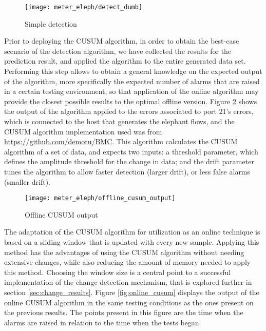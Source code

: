 \begin{figure}[H]
    \centering
    \texttt{[image: meter\_eleph/detect\_dumb]}
    \caption {Simple detection}
    \label{fig:detect_dumb}
\end{figure} 

\par Prior to deploying the CUSUM algorithm, in order to obtain the best-case scenario of the detection algorithm, we have collected the results for the prediction
result, and applied the algorithm to the entire generated data set. Performing this step allows to obtain a general knowledge on the expected output of the algorithm,
more specifically the expected number of alarms that are raised in a certain testing environment, so that application of the online algorithm may provide the
closest possible results to the optimal offline version. Figure  \ref{fig:offline_cusum} shows the output of the algorithm applied to the errors associated to
port 21's errors, which is connected to the host that generates the elephant flows, and the CUSUM algorithm implementation used was from 
\url{https://github.com/demotu/BMC}. This algorithm calculates the CUSUM algorithm of a set of data, and expects two inputs: a threshold parameter, which defines
the amplitude threshold for the change in data; and the drift parameter tunes the algorithm to allow faster detection (larger drift), or less false alarms (smaller 
drift). 

\begin{figure} [H]
    \centering
    \texttt{[image: meter\_eleph/offline\_cusum\_output]}
    \caption {Offline CUSUM output}
    \label{fig:offline_cusum}
\end{figure} 

\par The adaptation of the CUSUM algorithm for utilization as an online technique is based on a sliding window that is updated with every new sample. Applying this
method has the advantages of using the CUSUM algorithm without needing extensive changes, while also reducing the amount of memory needed to apply this method. 
Choosing the window size is a central point to a successful implementation of the change detection mechanism, that is explored further in section 
\ref{sec:change_results}. Figure \ref{fig:online_cusum} displays the output of the online CUSUM algorithm in the same testing conditions as the ones present on
the previous results. The points present in this figure are the time when the alarms are raised in relation to the time when the tests began.

